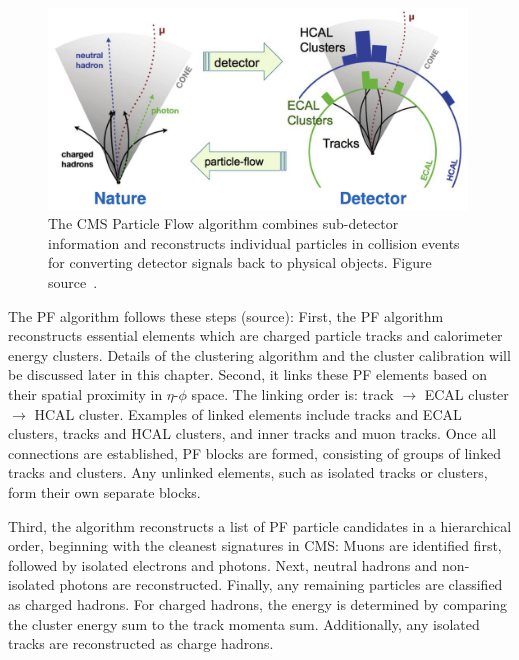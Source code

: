 \begin{figure}[t!]
\centering
\includegraphics[width=0.99\textwidth]{figures/PF.png}
\caption[A diagram of the PF algorithm]{The CMS Particle Flow algorithm combines sub-detector information and reconstructs individual
particles in collision events for converting detector signals back to physical objects. Figure source~\cite{PF_diagram}.}
\label{fig:PF_diagram}
\end{figure}

The PF algorithm follows these steps (source):
First, the PF algorithm reconstructs essential elements which are charged particle tracks and calorimeter energy clusters.
Details of the clustering algorithm and the cluster calibration will be discussed later in this chapter.
Second, it links these PF elements based on their spatial proximity in $\eta$-$\phi$ space.
The linking order is: track $\rightarrow$ ECAL cluster $\rightarrow$ HCAL cluster.
Examples of linked elements include tracks and ECAL clusters, tracks and HCAL clusters, and inner tracks and muon tracks.
Once all connections are established, PF blocks are formed, consisting of groups of linked tracks and clusters.
Any unlinked elements, such as isolated tracks or clusters, form their own separate blocks.

Third, the algorithm reconstructs a list of PF particle candidates in a hierarchical order, beginning with the cleanest signatures in CMS:
Muons are identified first, followed by isolated electrons and photons. Next, neutral hadrons and non-isolated photons are reconstructed.
Finally, any remaining particles are classified as charged hadrons.
For charged hadrons, the energy is determined by comparing the cluster energy sum to the track momenta sum.
Additionally, any isolated tracks are reconstructed as charge hadrons.

